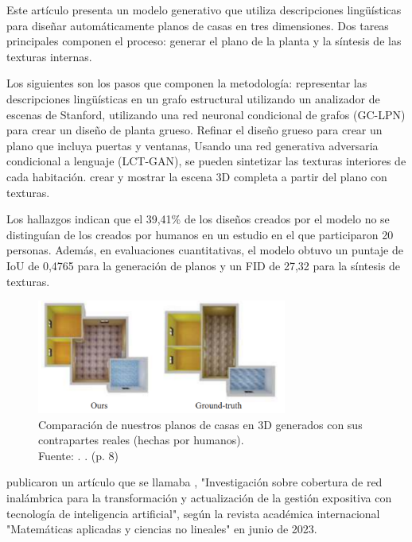 Este artículo presenta un modelo generativo que utiliza descripciones lingüísticas para diseñar automáticamente planos de casas en tres dimensiones. Dos tareas principales componen el proceso: generar el plano de la planta y la síntesis de las texturas internas.

Los siguientes son los pasos que componen la metodología: representar las descripciones lingüísticas en un grafo estructural utilizando un analizador de escenas de Stanford, utilizando una red neuronal condicional de grafos (GC-LPN) para crear un diseño de planta grueso. Refinar el diseño grueso para crear un plano que incluya puertas y ventanas, Usando una red generativa adversaria condicional a lenguaje (LCT-GAN), se pueden sintetizar las texturas interiores de cada habitación. crear y mostrar la escena 3D completa a partir del plano con texturas.

Los hallazgos indican que el 39,41\% de los diseños creados por el modelo no se distinguían de los creados por humanos en un estudio en el que participaron 20 personas. Además, en evaluaciones cuantitativas, el modelo obtuvo un puntaje de IoU de 0,4765 para la generación de planos y un FID de 27,32 para la síntesis de texturas.

\begin{figure}[!ht]
	\begin{center}
		\includegraphics[width=0.73\textwidth]{2/figures/chen2020.png}
		\caption[Comparación de nuestros planos de casas en 3D generados con sus contrapartes reales (hechas por humanos)]{Comparación de nuestros planos de casas en 3D generados con sus contrapartes reales (hechas por humanos).\\
		Fuente: \cite{pr_chen2020intelhome3d}. . (p. 8)}
		\label{2:fig122}
	\end{center}
\end{figure}

\cite{pr_dou2023researchwir} publicaron un artículo que se llamaba , "Investigación sobre cobertura de red inalámbrica para la transformación y actualización de la gestión expositiva con tecnología de inteligencia artificial", según la revista académica internacional "Matemáticas aplicadas y ciencias no lineales" en junio de 2023.

